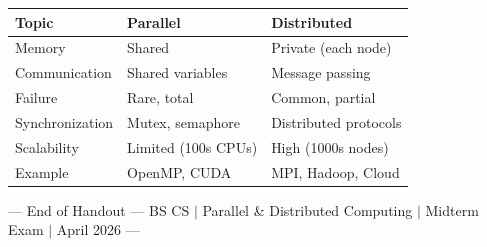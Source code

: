 \documentclass[11pt,a4paper]{article}
\begin{document}
\vspace{8pt}

\begin{center}
\begin{tcolorbox}[
  enhanced, colback=orange!5, colframe=orange!70!black,
  boxrule=1pt, arc=4pt, width=\textwidth,
  title={\faIcon{tasks}~Comparison Summary}, fonttitle=\bfseries,
  colbacktitle=orange!70!black, coltitle=white
]
\begin{tabular}{@{}p{4.8cm}p{4.8cm}p{4.8cm}@{}}
\toprule
\rowcolor{orange!20}
\textbf{Topic} & \textbf{Parallel} & \textbf{Distributed} \\
\midrule
Memory & Shared & Private (each node) \\
Communication & Shared variables & Message passing \\
Failure & Rare, total & Common, partial \\
Synchronization & Mutex, semaphore & Distributed protocols \\
Scalability & Limited (100s CPUs) & High (1000s nodes) \\
Example & OpenMP, CUDA & MPI, Hadoop, Cloud \\
\bottomrule
\end{tabular}
\end{tcolorbox}
\end{center}

\vspace{4pt}
\begin{center}
\textcolor{gray!60}{\small --- End of Handout --- BS CS $|$ Parallel \& Distributed Computing $|$ Midterm Exam $|$ April 2026 ---}
\end{center}
\end{document}
